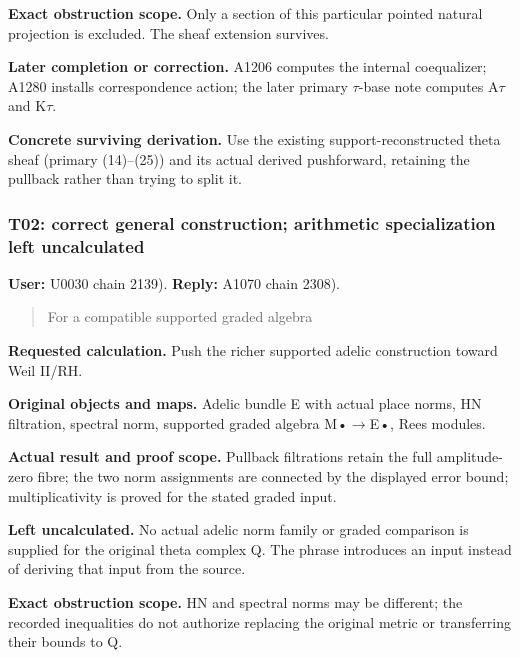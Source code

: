 \documentclass[10pt,a4paper,oneside]{report}
\begin{document}
\textbf{Exact obstruction scope.} Only a section of this particular
pointed natural projection is excluded. The sheaf extension survives.

\textbf{Later completion or correction.} A1206 computes the internal
coequalizer; A1280 installs correspondence action; the later primary
\allowbreak{}\ensuremath{τ}\allowbreak{}-base note computes
A\allowbreak{}\ensuremath{τ}\allowbreak{} and
K\allowbreak{}\ensuremath{τ}\allowbreak{}.

\textbf{Concrete surviving derivation.} Use the existing
support-reconstructed theta sheaf (primary (14)--(25)) and its actual
derived pushforward, retaining the pullback rather than trying to split
it.

\subsubsection{T02: correct general construction; arithmetic
specialization left
uncalculated}\label{t02-correct-general-construction-arithmetic-specialization-left-uncalculated}

\textbf{User:} U0030
\protect{} chain 2139).
\textbf{Reply:} A1070
\protect{} chain 2308).

\begin{quote}
For a compatible supported graded algebra
\end{quote}

\textbf{Requested calculation.} Push the richer supported adelic
construction toward Weil II/RH.

\textbf{Original objects and maps.} Adelic bundle E with actual place
norms, HN filtration, spectral norm, supported graded algebra
M•\allowbreak{}\ensuremath{→}\allowbreak{}E•, Rees modules.

\textbf{Actual result and proof scope.} Pullback filtrations retain the
full amplitude-zero fibre; the two norm assignments are connected by the
displayed error bound; multiplicativity is proved for the stated graded
input.

\textbf{Left uncalculated.} No actual adelic norm family or graded
comparison is supplied for the original theta complex Q. The phrase
introduces an input instead of deriving that input from the source.

\textbf{Exact obstruction scope.} HN and spectral norms may be
different; the recorded inequalities do not authorize replacing the
original metric or transferring their bounds to Q.
\end{document}
